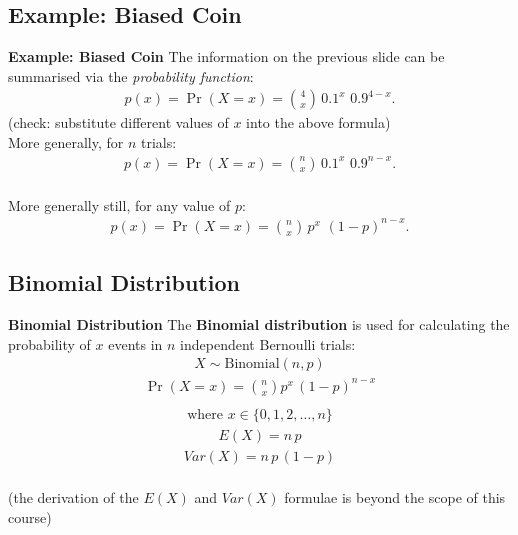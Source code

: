 \documentclass[compress]{beamer}        %
\makeatletter
\newcommand{\tcb}{\textcolor{beamer@blendedblue}}
\makeatother
\begin{document}
\subsection{Example: Biased Coin}
\begin{frame}{\bf \tcb{Example: Biased Coin}}
The information on the previous slide can be summarised via the \emph{probability function}:\\[-0.5cm]
\begin{align*}
p(x) = \Pr(X=x) = \binom{4}{x} \, 0.1^x \,\, 0.9^{4-x}.
\end{align*}
{\footnotesize(check: substitute different values of $x$ into the above formula)}\\[0.8cm]

More generally, for $n$ trials:
\begin{align*}
p(x) = \Pr(X=x) = \binom{n}{x} \, 0.1^x \,\, 0.9^{n-x}.\\
\end{align*}

More generally still, for any value of $p$:
\begin{align*}
p(x) = \Pr(X=x) = \binom{n}{x} \, p^x \,\, (1-p)^{n-x}.
\end{align*}

\end{frame}


\subsection{Binomial Distribution}
\begin{frame}{\bf \tcb{Binomial Distribution}}
The {\bf Binomial distribution} is used for calculating the probability of $x$ events in $n$ independent Bernoulli trials:
\begin{align*}
\boxed{X \sim \text{Binomial}(n,p)}
\end{align*}
\begin{align*}
\boxed{\Pr(X = x) = \binom{n}{x} p^x \, (1-p)^{n-x}}\\[-1cm]
\end{align*}
\begin{align*}
\text{where } \boxed{x \in \{0,1,2,\ldots,n\}}
\end{align*}
\begin{align*}
\boxed{E(X) = n\,p}
\end{align*}
\begin{align*}
\boxed{Var(X) = n\,p\,(1-p)}\\[-0.5cm]
\end{align*}

{\footnotesize(the derivation of the $E(X)$ and $Var(X)$ formulae is beyond the scope of this course)}

\end{frame}
\end{document}
